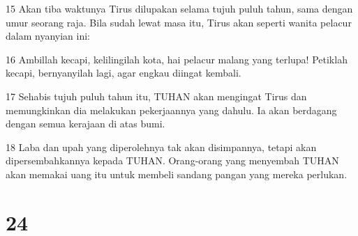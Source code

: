 \par 15 Akan tiba waktunya Tirus dilupakan selama tujuh puluh tahun, sama dengan umur seorang raja. Bila sudah lewat masa itu, Tirus akan seperti wanita pelacur dalam nyanyian ini:
\par 16 Ambillah kecapi, kelilingilah kota, hai pelacur malang yang terlupa! Petiklah kecapi, bernyanyilah lagi, agar engkau diingat kembali.
\par 17 Sehabis tujuh puluh tahun itu, TUHAN akan mengingat Tirus dan memungkinkan dia melakukan pekerjaannya yang dahulu. Ia akan berdagang dengan semua kerajaan di atas bumi.
\par 18 Laba dan upah yang diperolehnya tak akan disimpannya, tetapi akan dipersembahkannya kepada TUHAN. Orang-orang yang menyembah TUHAN akan memakai uang itu untuk membeli sandang pangan yang mereka perlukan.

\chapter{24}

